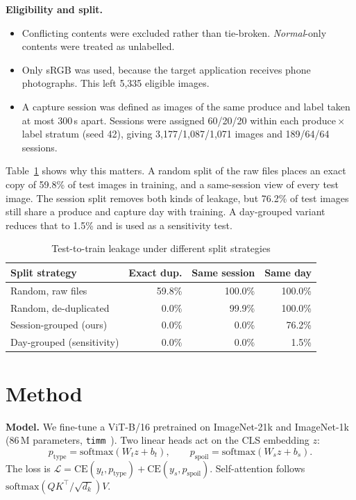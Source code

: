 \documentclass[conference]{IEEEtran}
\begin{document}
\textbf{Eligibility and split.}
\begin{itemize}
\item Conflicting contents were excluded rather than tie-broken. \emph{Normal}-only contents were treated as unlabelled.
\item Only sRGB was used, because the target application receives phone photographs. This left 5,335 eligible images.
\item A capture session was defined as images of the same produce and label taken at most 300\,s apart. Sessions were assigned 60/20/20 within each produce\,$\times$\,label stratum (seed 42), giving 3,177/1,087/1,071 images and 189/64/64 sessions.
\end{itemize}

Table~\ref{tab:leak} shows why this matters. A random split of the raw files places an exact copy of 59.8\% of test images in training, and a same-session view of every test image. The session split removes both kinds of leakage, but 76.2\% of test images still share a produce and capture day with training. A day-grouped variant reduces that to 1.5\% and is used as a sensitivity test.

\begin{table}[t]
\caption{Test-to-train leakage under different split strategies}
\label{tab:leak}
\centering\footnotesize
\begin{tabular}{@{}lrrr@{}}
\toprule
Split strategy & Exact dup. & Same session & Same day \\
\midrule
Random, raw files & 59.8\% & 100.0\% & 100.0\% \\
Random, de-duplicated & 0.0\% & 99.9\% & 100.0\% \\
Session-grouped (ours) & 0.0\% & 0.0\% & 76.2\% \\
Day-grouped (sensitivity) & 0.0\% & 0.0\% & 1.5\% \\
\bottomrule
\end{tabular}
\end{table}

\section{Method}
\textbf{Model.} We fine-tune a ViT-B/16 pretrained on ImageNet-21k and ImageNet-1k (86\,M parameters, \texttt{timm}~\cite{timm}). Two linear heads act on the CLS embedding $z$:
\begin{equation}
p_{\text{type}}=\mathrm{softmax}(W_t z+b_t),\qquad p_{\text{spoil}}=\mathrm{softmax}(W_s z+b_s).
\end{equation}
The loss is $\mathcal{L}=\mathrm{CE}(y_t,p_{\text{type}})+\mathrm{CE}(y_s,p_{\text{spoil}})$. Self-attention follows $\mathrm{softmax}(QK^\top/\sqrt{d_k})V$.
\end{document}
